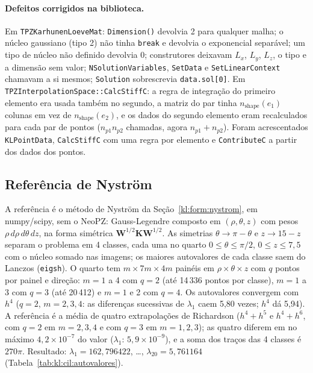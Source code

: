 \paragraph{Defeitos corrigidos na biblioteca.}
Em \texttt{TPZKarhunenLoeveMat}: \texttt{Dimension()} devolvia 2 para qualquer malha; o núcleo gaussiano (tipo 2) não
tinha \texttt{break} e devolvia o exponencial separável; um tipo de núcleo não definido devolvia 0; construtores
deixavam $L_x$, $L_y$, $L_z$, o tipo e a dimensão sem valor; \texttt{NSolutionVariables}, \texttt{SetData} e
\texttt{SetLinearContext} chamavam a si mesmos; \texttt{Solution} sobrescrevia \texttt{data.sol[0]}. Em
\texttt{TPZInterpolationSpace::CalcStiffC}: a regra de integração do primeiro elemento era usada também no segundo,
a matriz do par tinha $n_\text{shape}(e_1)$ colunas em vez de $n_\text{shape}(e_2)$, e os dados do segundo elemento
eram recalculados para cada par de pontos ($n_{p1} n_{p2}$ chamadas, agora $n_{p1} + n_{p2}$). Foram acrescentados
\texttt{KLPointData}, \texttt{CalcStiffC} com uma regra por elemento e \texttt{ContributeC} a partir dos dados dos
pontos.

\subsection{Referência de Nyström}\label{sec:kl:cil:nystrom}

A referência é o método de Nyström da Seção~\ref{kl:form:nystrom}, em numpy/scipy, sem o NeoPZ: Gauss-Legendre
composto em $(\rho, \theta, z)$ com pesos $\rho\,d\rho\,d\theta\,dz$, na forma simétrica
$\mathbf{W}^{1/2}\mathbf{K}\mathbf{W}^{1/2}$. As simetrias $\theta \to \pi - \theta$ e $z \to 15 - z$ separam o
problema em 4 classes, cada uma no quarto $0 \le \theta \le \pi/2$, $0 \le z \le 7{,}5$ com o núcleo somado nas
imagens; os maiores autovalores de cada classe saem do Lanczos (\texttt{eigsh}). O quarto tem
$m \times 7m \times 4m$ painéis em $\rho \times \theta \times z$ com $q$ pontos por painel e direção: $m = 1$ a 4 com
$q = 2$ (até 14\,336 pontos por classe), $m = 1$ a 3 com $q = 3$ (até 20\,412) e $m = 1$ e 2 com $q = 4$. Os
autovalores convergem com $h^4$ ($q = 2$, $m = 2, 3, 4$: as diferenças sucessivas de $\lambda_1$ caem 5,80 vezes;
$h^4$ dá 5,94). A referência é a média de quatro extrapolações de Richardson ($h^4 + h^5$ e $h^4 + h^6$, com $q = 2$
em $m = 2, 3, 4$ e com $q = 3$ em $m = 1, 2, 3$); as quatro diferem em no máximo $4{,}2 \times 10^{-7}$ do valor
($\lambda_1$: $5{,}9 \times 10^{-9}$), e a soma dos traços das 4 classes é $270\pi$. Resultado:
$\lambda_1 = 162{,}796422$, \ldots, $\lambda_{20} = 5{,}761164$ (Tabela~\ref{tab:kl:cil:autovalores}).

